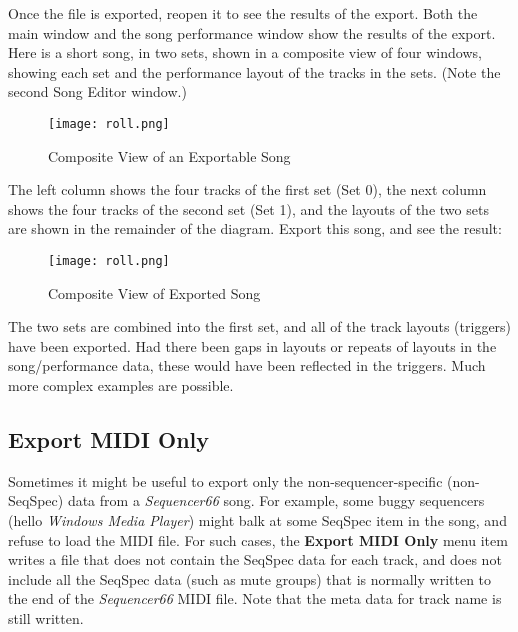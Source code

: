    Once the file is exported, reopen it to see the results of the export.
   Both the main window and the song performance window show the results of the
   export.
   Here is a short song, in two sets, shown in a composite view of
   four windows,
   showing each set and the performance layout of the tracks in the sets.
   (Note the second Song Editor window.)

\begin{figure}[H]
   \centering 
   \texttt{[image: roll.png]}
   \caption{Composite View of an Exportable Song}
   \label{fig:seq66_original_song_to_export}
\end{figure}

   The left column shows the four tracks of the first set (Set 0), the next
   column shows the four tracks of the second set (Set 1), and the
   layouts of the two sets are shown in the remainder of the diagram.
   Export this song, and see the result:

\begin{figure}[H]
   \centering 
   \texttt{[image: roll.png]}
   \caption{Composite View of Exported Song}
   \label{fig:seq66_song_exported}
\end{figure}

   The two sets are combined into the first set,
   and all of the track layouts (triggers) have been exported.
   Had there been gaps in layouts or repeats of layouts in the song/performance
   data, these would have been reflected in the triggers.
   Much more complex examples are possible.

\subsection{Export MIDI Only}
\label{subsec:seq66_midi_export_file_export_midi_only}

   Sometimes it might be useful to export only the non-sequencer-specific
   (non-SeqSpec) data from a \textsl{Sequencer66} song.
   For example, some buggy sequencers
   (hello \textsl{Windows Media Player})
   might balk at some SeqSpec item in the song, and refuse to load the MIDI
   file.
   For such cases,
   the \textbf{Export MIDI Only} menu item writes a file that does not contain
   the SeqSpec data for each track, and does not include all the SeqSpec data
   (such as mute groups) that is normally written to the end of the
   \textsl{Sequencer66} MIDI file.
   Note that the meta data for track name is still written.

